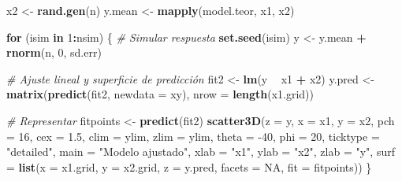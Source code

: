 \documentclass[
]{book}
\newenvironment{Shaded}{\begin{snugshade}}{\end{snugshade}}
\newcommand{\CommentTok}[1]{\textcolor[rgb]{0.56,0.35,0.01}{\textit{#1}}}
\newcommand{\ControlFlowTok}[1]{\textcolor[rgb]{0.13,0.29,0.53}{\textbf{#1}}}
\newcommand{\DataTypeTok}[1]{\textcolor[rgb]{0.13,0.29,0.53}{#1}}
\newcommand{\DecValTok}[1]{\textcolor[rgb]{0.00,0.00,0.81}{#1}}
\newcommand{\FloatTok}[1]{\textcolor[rgb]{0.00,0.00,0.81}{#1}}
\newcommand{\KeywordTok}[1]{\textcolor[rgb]{0.13,0.29,0.53}{\textbf{#1}}}
\newcommand{\NormalTok}[1]{#1}
\newcommand{\OperatorTok}[1]{\textcolor[rgb]{0.81,0.36,0.00}{\textbf{#1}}}
\newcommand{\OtherTok}[1]{\textcolor[rgb]{0.56,0.35,0.01}{#1}}
\newcommand{\StringTok}[1]{\textcolor[rgb]{0.31,0.60,0.02}{#1}}
\theoremstyle{break}
\theoremstyle{definition}
\theoremstyle{definition}
\theoremstyle{definition}
\theoremstyle{remark}
\begin{document}
\begin{Shaded}
\begin{Highlighting}[]
\NormalTok{x2 <-}\StringTok{ }\KeywordTok{rand.gen}\NormalTok{(n)}
\NormalTok{y.mean <-}\StringTok{ }\KeywordTok{mapply}\NormalTok{(model.teor, x1, x2)}

\ControlFlowTok{for}\NormalTok{ (isim }\ControlFlowTok{in} \DecValTok{1}\OperatorTok{:}\NormalTok{nsim) \{}
  \CommentTok{# Simular respuesta}
  \KeywordTok{set.seed}\NormalTok{(isim)}
\NormalTok{  y <-}\StringTok{ }\NormalTok{y.mean }\OperatorTok{+}\StringTok{ }\KeywordTok{rnorm}\NormalTok{(n, }\DecValTok{0}\NormalTok{, sd.err)}
  
  \CommentTok{# Ajuste lineal y superficie de predicción}
\NormalTok{  fit2 <-}\StringTok{ }\KeywordTok{lm}\NormalTok{(y }\OperatorTok{~}\StringTok{ }\NormalTok{x1 }\OperatorTok{+}\StringTok{ }\NormalTok{x2)}
\NormalTok{  y.pred <-}\StringTok{ }\KeywordTok{matrix}\NormalTok{(}\KeywordTok{predict}\NormalTok{(fit2, }\DataTypeTok{newdata =}\NormalTok{ xy), }\DataTypeTok{nrow =} \KeywordTok{length}\NormalTok{(x1.grid)) }
  
  \CommentTok{# Representar}
\NormalTok{  fitpoints <-}\StringTok{ }\KeywordTok{predict}\NormalTok{(fit2) }
  \KeywordTok{scatter3D}\NormalTok{(}\DataTypeTok{z =}\NormalTok{ y, }\DataTypeTok{x =}\NormalTok{ x1, }\DataTypeTok{y =}\NormalTok{ x2, }\DataTypeTok{pch =} \DecValTok{16}\NormalTok{, }\DataTypeTok{cex =} \FloatTok{1.5}\NormalTok{, }\DataTypeTok{clim =}\NormalTok{ ylim, }\DataTypeTok{zlim =}\NormalTok{ ylim,}
            \DataTypeTok{theta =} \DecValTok{-40}\NormalTok{, }\DataTypeTok{phi =} \DecValTok{20}\NormalTok{, }\DataTypeTok{ticktype =} \StringTok{"detailed"}\NormalTok{, }
            \DataTypeTok{main =} \StringTok{"Modelo ajustado"}\NormalTok{, }\DataTypeTok{xlab =} \StringTok{"x1"}\NormalTok{, }\DataTypeTok{ylab =} \StringTok{"x2"}\NormalTok{, }\DataTypeTok{zlab =} \StringTok{"y"}\NormalTok{, }
            \DataTypeTok{surf =} \KeywordTok{list}\NormalTok{(}\DataTypeTok{x =}\NormalTok{ x1.grid, }\DataTypeTok{y =}\NormalTok{ x2.grid, }\DataTypeTok{z =}\NormalTok{ y.pred, }
                        \DataTypeTok{facets =} \OtherTok{NA}\NormalTok{, }\DataTypeTok{fit =}\NormalTok{ fitpoints))}
\NormalTok{\}}
\end{Highlighting}
\end{Shaded}

\begin{center}\end{center}
\end{document}
